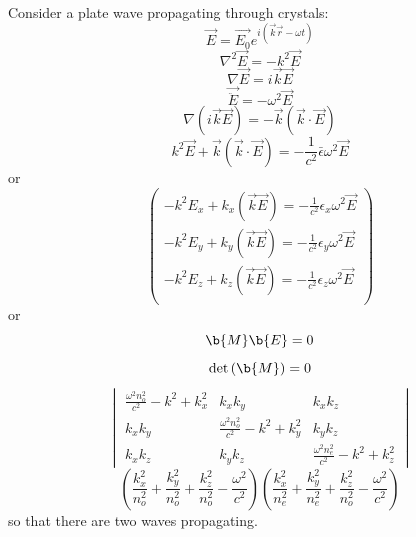 \documentclass[10pt]{article}
\begin{document}
Consider a plate wave propagating through crystals:
\begin{equation*}
\vec{E} = \vec{E_0}e^{i(\vec{k}\vec{r} - \omega t)}
\end{equation*}
\begin{equation*}
\nabla^2 \vec{E} = -k^2 \vec{E}
\end{equation*}
\begin{equation*}
\nabla \vec{E} = i\vec{k}\vec{E}
\end{equation*}
\begin{equation*}
\vec{\ddot{E}} = - \omega^2 \vec{E}
\end{equation*}
\begin{equation*}
\nabla (i \vec{k} \vec{E}) = - \vec{k}(\vec{k} \cdot \vec{E})
\end{equation*}
\begin{equation*}
k^2 \vec{E} + \vec{k}(\vec{k} \cdot \vec{E}) = - \frac{1}{c^2} \bar{\epsilon} \omega^2 \vec{E}
\end{equation*}
or
\begin{equation}
\left( \begin{array}{c}
-k^2 E_x + k_x(\vec{k}\vec{E}) = -\frac{1}{c^2} \epsilon_x \omega^2 \vec{E} \\
-k^2 E_y + k_y(\vec{k}\vec{E}) = -\frac{1}{c^2} \epsilon_y \omega^2 \vec{E} \\
-k^2 E_z + k_z(\vec{k}\vec{E}) = -\frac{1}{c^2} \epsilon_z \omega^2 \vec{E} \\
\end{array} \right)
\end{equation}
or
\begin{equation*}
\b{M} \b{E} = 0
\end{equation*}
\begin{equation*}
\det{(\b{M})} = 0
\end{equation*}
\begin{equation*}
\begin{vmatrix}
\frac{\omega^2 n_o ^2}{c^2} - k^2 + k_x ^2 & k_x k_y & k_x k_z \\
k_x k_y & \frac{\omega^2 n_o ^2}{c^2} - k^2 + k_y ^2 & k_y k_z \\
k_x k_z & k_y k_z & \frac{\omega^2 n_e ^2}{c^2} - k^2 + k_z ^2
\end{vmatrix}
\end{equation*}
\begin{equation}\boxed{
\left(\frac{k_x ^2}{n_o ^2} + \frac{k_y ^2}{n_o ^2} + \frac{k_z ^2}{n_o ^2} - \frac{\omega^2}{c^2}\right)\left(\frac{k_x ^2}{n_e ^2} + \frac{k_y ^2}{n_e ^2} + \frac{k_z ^2}{n_o ^2} - \frac{\omega^2}{c^2}\right)
}\end{equation}
so that there are two waves propagating.
\end{document}
